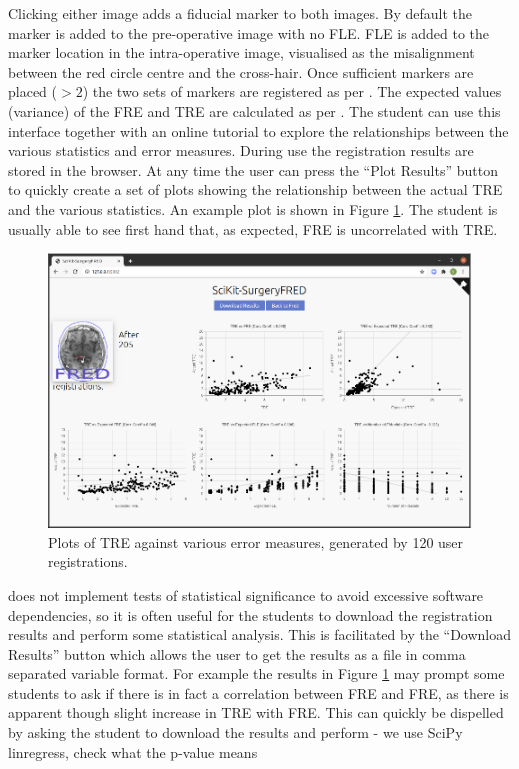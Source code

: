 Clicking either image adds a fiducial marker to both images. By default the marker is added to the pre-operative image 
with no \gls{FLE}. \gls{FLE} is added to the marker location in the intra-operative image, visualised as the misalignment
between the red circle centre and the cross-hair. Once sufficient markers are placed ($>2$) the two sets of markers are registered as per \cite{Arun1987}. The expected values (variance) of the \gls{FRE} and \gls{TRE} are calculated 
as per \cite{Fitzpatrick1998}. The student can use this interface together with an 
online tutorial 
to explore the relationships between the various statistics and error measures. During use the registration results are 
stored in the browser. At any time the user can press the ``Plot Results'' button to quickly create a set of 
plots showing the relationship between the actual \gls{TRE} and the various statistics. 
An example plot is shown in Figure \ref{fig:correlation}. 
The student is usually able to see first hand that, as expected, \gls{FRE} is uncorrelated with \gls{TRE}. 

\begin{figure}
	\begin{center}
	\includegraphics[width=0.9\linewidth]{images/default.eps}
		\caption{\label{fig:correlation}Plots of TRE against various error measures, generated by 
		120 user registrations.}
	\end{center}
\end{figure}

\fred does not implement tests of statistical significance to avoid excessive software dependencies, so it is often 
useful for the students to download the registration results and perform some statistical analysis. This is facilitated by the 
``Download Results'' button which allows the user to get the results as a file in comma separated variable format. 
For example the results in Figure \ref{fig:correlation} may prompt some students to ask if there is in fact a correlation 
between \gls{FRE} and \gls{FRE}, as there is apparent though slight increase in \gls{TRE} with \gls{FRE}. This can quickly 
be dispelled by asking the student to download the results and perform 
\hereIam - we use SciPy linregress, check what the p-value means


